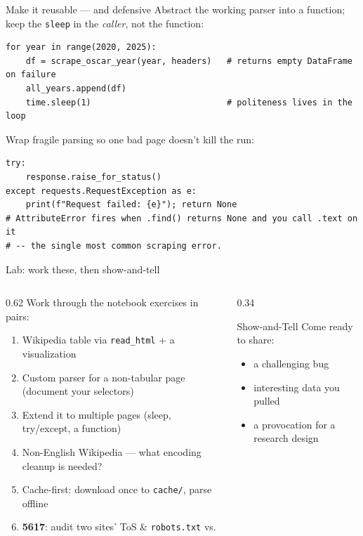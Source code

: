\documentclass[9pt,aspectratio=169]{beamer}
\begin{document}
\begin{frame}[fragile]{Make it reusable --- and defensive}
    Abstract the working parser into a function; keep the \texttt{sleep} in the \textit{caller}, not the function:
\begin{lstlisting}
for year in range(2020, 2025):
    df = scrape_oscar_year(year, headers)   # returns empty DataFrame on failure
    all_years.append(df)
    time.sleep(1)                           # politeness lives in the loop
\end{lstlisting}
    Wrap fragile parsing so one bad page doesn't kill the run:
\begin{lstlisting}
try:
    response.raise_for_status()
except requests.RequestException as e:
    print(f"Request failed: {e}"); return None
# AttributeError fires when .find() returns None and you call .text on it
# -- the single most common scraping error.
\end{lstlisting}
\end{frame}

\begin{frame}{Lab: work these, then show-and-tell}
    \begin{columns}[T]
        \begin{column}{0.62\textwidth}
            Work through the notebook exercises in pairs:
            \begin{enumerate}\small
                \item Wikipedia table via \texttt{read\_html} + a visualization
                \item Custom parser for a non-tabular page (document your selectors)
                \item Extend it to multiple pages (sleep, try/except, a function)
                \item Non-English Wikipedia --- what encoding cleanup is needed?
                \item Cache-first: download once to \texttt{cache/}, parse offline
                \item[6.] \textcolor{tab-purple}{\textbf{5617}}: audit two sites' ToS \& \texttt{robots.txt} vs.\ \textcite{fiesler2020no}
            \end{enumerate}
        \end{column}
        \begin{column}{0.34\textwidth}
            \begin{block}{Show-and-Tell}
                \footnotesize Come ready to share:
                \begin{itemize}\footnotesize
                    \item a challenging bug
                    \item interesting data you pulled
                    \item a provocation for a research design
                \end{itemize}
            \end{block}
        \end{column}
    \end{columns}
\end{frame}
\end{document}

